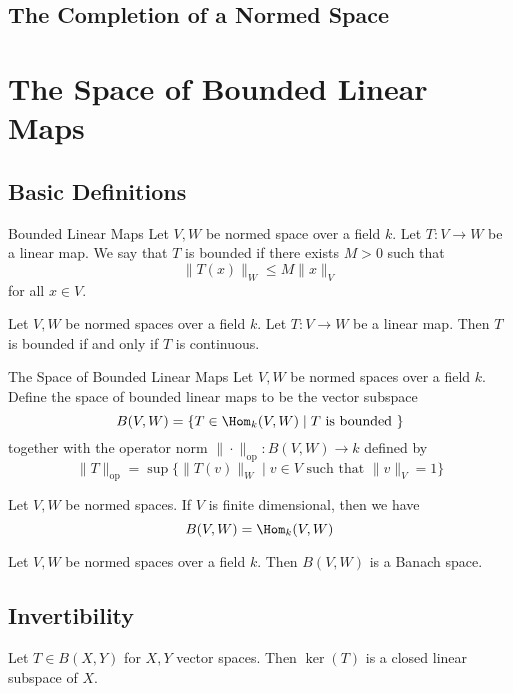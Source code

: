 \documentclass[a4paper]{article}
\begin{document}
\subsection{The Completion of a Normed Space}

\pagebreak
\section{The Space of Bounded Linear Maps}
\subsection{Basic Definitions}
\begin{defn}{Bounded Linear Maps}{} Let $V,W$ be normed space over a field $k$. Let $T:V\to W$ be a linear map. We say that $T$ is bounded if there exists $M>0$ such that $$\|T(x)\|_W\leq M\|x\|_V$$ for all $x\in V$. 
\end{defn}

\begin{lmm}{}{} Let $V,W$ be normed spaces over a field $k$. Let $T:V\to W$ be a linear map. Then $T$ is bounded if and only if $T$ is continuous. 
\end{lmm}

\begin{defn}{The Space of Bounded Linear Maps}{} Let $V,W$ be normed spaces over a field $k$. Define the space of bounded linear maps to be the vector subspace $$B(V,W)=\{T\in\Hom_k(V,W)\;|\;T\text{ is bounded }\}$$ together with the operator norm $\|\cdot\|_{\text{op}}:B(V,W)\to k$ defined by $$\|T\|_{\text{op}}=\sup\{\|T(v)\|_W\;|\;v\in V\text{ such that }\|v\|_V=1\}$$
\end{defn}

\begin{lmm}{}{} Let $V,W$ be normed spaces. If $V$ is finite dimensional, then we have $$B(V,W)=\Hom_k(V,W)$$
\end{lmm}

\begin{lmm}{}{} Let $V,W$ be normed spaces over a field $k$. Then $B(V,W)$ is a Banach space. 
\end{lmm}

\subsection{Invertibility}
\begin{crl}{}{} Let $T\in B(X,Y)$ for $X,Y$ vector spaces. Then $\ker(T)$ is a closed linear subspace of $X$. 
\end{crl}
\end{document}

